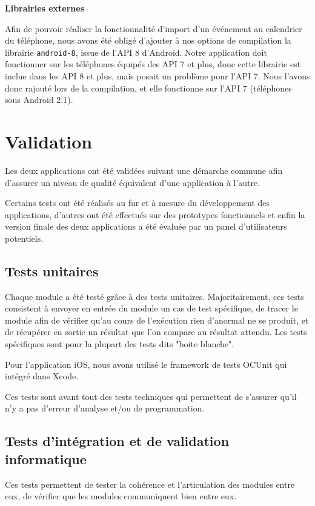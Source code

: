 \documentclass[a4paper, 11pt]{article}
\begin{document}
{\bf Librairies externes}

Afin de pouvoir réaliser la fonctionnalité d'import d'un événement au calendrier du téléphone, nous avons été obligé d'ajouter à nos options de compilation la librairie \texttt{android-8}, issue de l'API 8 d'Android. Notre application doit fonctionner sur les téléphones équipés des API 7 et plus, donc cette librairie est inclue dans les API 8 et plus, mais posait un problème pour l'API 7. Nous l'avons donc rajouté lors de la compilation, et elle fonctionne sur l'API 7 (téléphones sous Android 2.1).


\section{Validation}
Les deux applications ont été validées suivant une démarche commune afin d'assurer un niveau de qualité équivalent d'une application à l'autre.

Certains tests ont été réalisés au fur et à mesure du développement des applications, d'autres ont été effectués sur des prototypes fonctionnels et enfin la version finale des deux applications a été évaluée par un panel d'utilisateurs potentiels.

\subsection{Tests unitaires}
Chaque module a été testé grâce à des tests unitaires. Majoritairement, ces tests consistent à envoyer en entrée du module un cas de test spécifique, de tracer le module afin de vérifier qu'au cours de l'exécution rien d'anormal ne se produit, et de récupérer en sortie un résultat que l'on compare au résultat attendu. Les tests spécifiques sont pour la plupart des tests dits "boite blanche".

Pour l'application iOS, nous avons utilisé le framework de tests OCUnit qui intégré dans Xcode. 

Ces tests sont avant tout des tests techniques qui permettent de s'assurer qu'il n'y a pas d'erreur d'analyse et/ou de programmation.

\subsection{Tests d'intégration et de validation informatique}
Ces tests permettent de tester la cohérence et l'articulation des modules entre eux, de vérifier que les modules communiquent bien entre eux.
\end{document}
